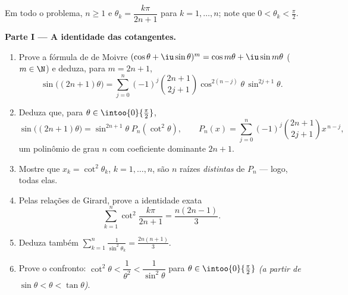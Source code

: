 \begin{problem}[{Problema de fim de semana --- $\zeta(2) = \pi^2/6$ e o
panorama de Bertrand}]
\label{pb:b2:series:1}
Em todo o problema, $n \geq 1$ e $\theta_k = \dfrac{k\pi}{2n+1}$ para $k
= 1, \dots, n$; note que $0 < \theta_k < \frac\pi2$.

\medskip
\noindent\textbf{Parte I --- A identidade das cotangentes.}
\begin{enumerate}
  \item Prove a fórmula de de Moivre $(\cos\theta +
        \iu\sin\theta)^m = \cos m\theta + \iu\sin m\theta$ ($m
        \in \N$) e deduza, para $m = 2n + 1$,
        \[
        \sin\bigl((2n{+}1)\theta\bigr) = \sum_{j=0}^{n}
        (-1)^j\binom{2n+1}{2j+1}\cos^{2(n-j)}\theta\,
        \sin^{2j+1}\theta .
        \]
  \item Deduza que, para $\theta \in \intoo{0}{\frac\pi2}$,
        \[
        \sin\bigl((2n{+}1)\theta\bigr) =
        \sin^{2n+1}\theta\; P_n(\cot^2\theta),
        \qquad
        P_n(x) = \sum_{j=0}^{n}
        (-1)^j\binom{2n+1}{2j+1}x^{\,n-j},
        \]
        um polinômio de grau $n$ com coeficiente dominante $2n
        + 1$.
  \item Mostre que $x_k = \cot^2\theta_k$, $k = 1, \dots, n$, são
        $n$ raízes \emph{distintas} de $P_n$ --- logo, todas
        elas.
  \item Pelas relações de Girard, prove a identidade exata
        \[
        \sum_{k=1}^{n} \cot^2\frac{k\pi}{2n+1}
        = \frac{n(2n-1)}{3}.
        \]
  \item Deduza também $\displaystyle\sum_{k=1}^{n}
        \frac{1}{\sin^2\theta_k} = \frac{2n(n+1)}{3}$.
  \item Prove o confronto: $\cot^2\theta < \dfrac1{\theta^2} <
        \dfrac{1}{\sin^2\theta}$ para $\theta \in
        \intoo{0}{\frac\pi2}$ \emph{(a partir de $\sin\theta < \theta <
        \tan\theta$)}.
\end{enumerate}


\end{problem}
